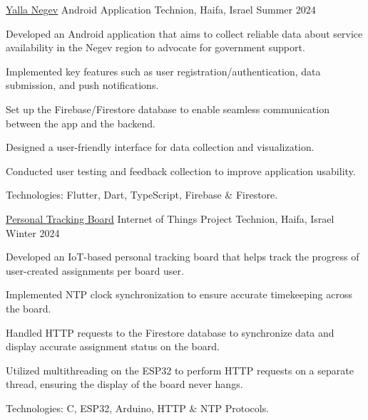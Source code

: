 

\begin{cventries}

  \cventry
    {\href{https://github.com/WizardCell/Yalla-Negev}{\underline{Yalla Negev}}} %
    {Android Application} %
    {Technion, Haifa, Israel} %
    {Summer 2024} %
    {
      \begin{cvitems} %
        \item {Developed an Android application that aims to collect reliable data about service availability in the Negev region to advocate for government support.}
        \item {Implemented key features such as user registration/authentication, data submission, and push notifications.}
        \item {Set up the Firebase/Firestore database to enable seamless communication between the app and the backend.}
        \item {Designed a user-friendly interface for data collection and visualization.}
        \item {Conducted user testing and feedback collection to improve application usability.}
        \item {Technologies: Flutter, Dart, TypeScript, Firebase \& Firestore.}
        \end{cvitems}
    }

  \cventry
    {\href{https://github.com/WizardCell/Personal-Tracking-Board}{\underline{Personal Tracking Board}}} %
    {Internet of Things Project} %
    {Technion, Haifa, Israel} %
    {Winter 2024} %
    {
      \begin{cvitems} %
        \item {Developed an IoT-based personal tracking board that helps track the progress of user-created assignments per board user.}
        \item {Implemented NTP clock synchronization to ensure accurate timekeeping across the board.}
        \item {Handled HTTP requests to the Firestore database to synchronize data and display accurate assignment status on the board.}
        \item {Utilized multithreading on the ESP32 to perform HTTP requests on a separate thread, ensuring the display of the board never hangs.}
        \item {Technologies: C, ESP32, Arduino, HTTP \& NTP Protocols.}
      \end{cvitems}
    }

\end{cventries}